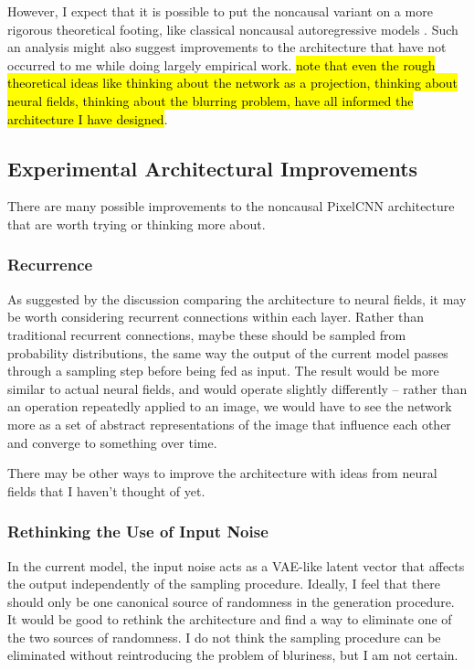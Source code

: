 \documentclass[10pt,a4paper]{article}
\begin{document}
However, I expect that it is possible to put the noncausal variant on a more rigorous theoretical footing, like classical noncausal autoregressive models \cite{??}. Such an analysis might also suggest improvements to the architecture that have not occurred to me while doing largely empirical work. \hl{note that even the rough theoretical ideas like thinking about the network as a projection, thinking about neural fields, thinking about the blurring problem, have all informed the architecture I have designed}. 

\subsection{Experimental Architectural Improvements}

There are many possible improvements to the noncausal PixelCNN architecture that are worth trying or thinking more about.

\subsubsection{Recurrence}

As suggested by the discussion comparing the architecture to neural fields, it may be worth considering recurrent connections within each layer. Rather than traditional recurrent connections, maybe these should be sampled from probability distributions, the same way the output of the current model passes through a sampling step before being fed as input. The result would be more similar to actual neural fields, and would operate slightly differently -- rather than an operation repeatedly applied to an image, we would have to see the network more as a set of abstract representations of the image that influence each other and converge to something over time.

There may be other ways to improve the architecture with ideas from neural fields that I haven't thought of yet.

\subsubsection{Rethinking the Use of Input Noise}

In the current model, the input noise acts as a VAE-like latent vector that affects the output independently of the sampling procedure. Ideally, I feel that there should only be one canonical source of randomness in the generation procedure. It would be good to rethink the architecture and find a way to eliminate one of the two sources of randomness. I do not think the sampling procedure can be eliminated without reintroducing the problem of bluriness, but I am not certain.
\end{document}
